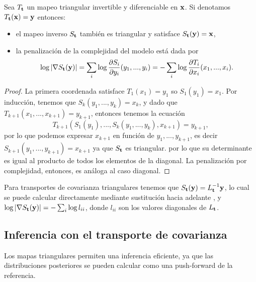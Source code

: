\begin{proposition}
	Sea \(T_{\mathbf{t}}\) un mapeo triangular invertible y diferenciable en \(\mathbf{x}\). Si denotamos \(T_{\mathbf{t}}(\mathbf{x}) = \mathbf{y}\) entonces:
	\begin{itemize}
		\item el mapeo inverso \(S_{\mathbf{t}}\) también es triangular y satisface \(S_{\mathbf{t}}(\mathbf{y}) = \mathbf{x}\),
		\item la penalización de la complejidad del modelo está dada por \[\log|\nabla S_{\mathbf{t}}(\mathbf{y})| = \sum_{i} \log \frac{\partial S_i}{\partial  y_i}(y_1,...,y_i)=- \sum_{i} \log \frac{\partial T_i}{\partial  x_i}(x_1,...,x_i).\]
	\end{itemize}
	\begin{proof}
		La primera coordenada satisface \(T_1(x_1) = y_1\) so \(S_1(y_1) = x_1\). Por inducción, tenemos que \(S_k(y_1,...,y_k) = x_k\), y dado que \(T_{k+1}(x_1,...,x_{k+1}) = y_{k+1}\), entonces tenemos la ecuación \[T_{k+1}(S_1(y_1),...,S_k(y_1,...,y_k), x_{k+1}) = y_{k+1},\] por lo que podemos expresar \(x_{k+1}\) en función de \(y_1,...,y_{k+1}\), es decir \(S_{k+1}(y_1,...,y_{k+1}) = x_{k+1}\) ya que \(S_{\mathbf{t}}\) es triangular. por lo que su determinante es igual al producto de todos los elementos de la diagonal. La penalización por complejidad, entonces, es análoga al caso diagonal.
	\end{proof} 	
\end{proposition}
Para transportes de covarianza triangulares tenemos que \(S_{\mathbf{t}}(\mathbf{y})=L_{\mathbf{t}}^{-1}\mathbf{y}\), lo cual se puede calcular directamente mediante sustitución hacia adelante \cite{demmel1997applied}, y \(\log|\nabla S_{\mathbf{t}}(\mathbf{y})| = - \sum_{i} \log l_{ii}\), donde \(l_{ii}\) son los valores diagonales de \(L_{\mathbf{t}}\).

\subsection{Inferencia con el transporte de covarianza}
Los mapas triangulares permiten una inferencia eficiente, ya que las distribuciones posteriores se pueden calcular como una push-forward de la referencia.

